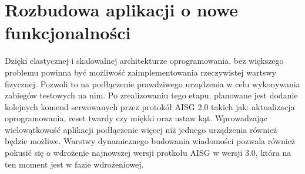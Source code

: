 \section{Rozbudowa aplikacji o nowe funkcjonalności}
    Dzięki elastycznej i skalowalnej architekturze oprogramowania, bez większego problemu powinna być możliwość zaimplementowania rzeczywistej
    wartswy fizycznej. Pozwoli to na podłączenie prawdziwego urządzenia w celu wykonywania zabiegów testowych na nim. Po zrealizowaniu
    tego etapu, planowane jest dodanie kolejnych komend serwowanych przez protokół AISG 2.0 takich jak: aktualizacja oprogramowania, 
    reset twardy czy miękki oraz ustaw kąt. Wprowadzając wielowątkowość aplikacji podłączenie więcej niż jednego urządzenia również będzie możliwe.
    Warstwy dynamicznego budowania wiadomości pozwala również pokusić się o wdrożenie najnowszej wersji protkołu AISG w wersji 3.0, która na ten moment
    jest w fazie wdrożeniowej.
